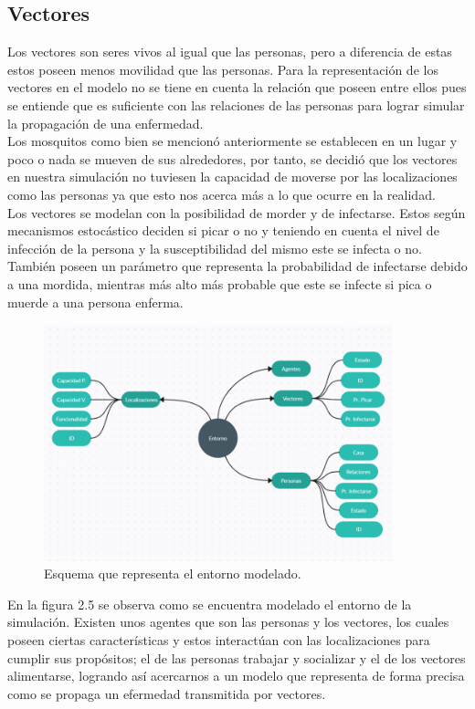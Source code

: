 \subsection{Vectores}
Los vectores son seres vivos al igual que las personas, pero a diferencia de estas estos poseen menos movilidad que las
personas. Para la representación de los vectores en el modelo no se tiene en cuenta la relación que 
poseen entre ellos pues se entiende que es suficiente con las relaciones de las personas para lograr simular 
la propagación de una enfermedad.\\ 

Los mosquitos como bien se mencionó anteriormente se establecen en un lugar y poco o nada se mueven de 
sus alrededores, por tanto, se decidió que los vectores en nuestra simulación no tuviesen la capacidad de moverse por
las localizaciones como las personas ya que esto nos acerca más a lo que ocurre en la realidad.\\

Los vectores se modelan con la posibilidad de morder y de infectarse. Estos según mecanismos estocástico
deciden si picar o no y teniendo en cuenta el nivel de infección de la persona y la susceptibilidad del mismo este
se infecta o no. También poseen un parámetro que representa la probabilidad de infectarse debido a una mordida, mientras
más alto más probable que este se infecte si pica o muerde a una persona enferma.\\

\begin{figure}[htb]
    \centering
    \includegraphics[width=0.9\textwidth]{Graphics/Pers_Loc_Vec.png}
    \caption{Esquema que representa el entorno modelado.}
\end{figure}
En la figura 2.5 se observa como se encuentra modelado el entorno de la simulación. Existen unos agentes que son las
personas y los vectores, los cuales poseen ciertas características y estos interactúan con las localizaciones para
cumplir sus propósitos; el de las personas trabajar y socializar y el de los vectores alimentarse, logrando así
acercarnos a un modelo que representa de forma precisa como se propaga un efermedad transmitida por vectores.
\newpage

